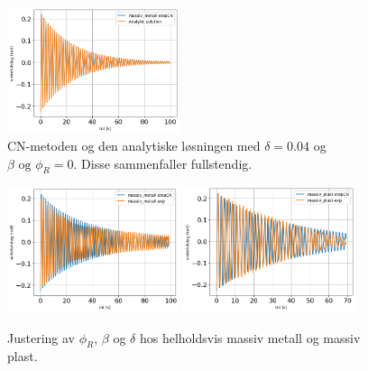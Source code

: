 \documentclass[5p]{elsarticle}
\begin{document}
\begin{figure}[p] 
	\begin{center}
		\includegraphics[width=0.45\textwidth]{Plots/Saved-Plots/combined-analytic/massiv_metall-stepCN.png}
  
 \end{center}
	\caption{CN-metoden og den analytiske løsningen med \(\delta = 0.04\) og \(\beta \text{ og } \phi_R = 0\). Disse sammenfaller fullstendig.}
	\label{Fig CN} %
\end{figure}

\begin{figure}[p] 
	\begin{center}
            \includegraphics[width=0.45\textwidth]{Plots/Saved-Plots/Justert/Massiv metall/massiv_metall-stepCN.png}
		\includegraphics[width=0.45\textwidth]{Plots/Saved-Plots/Justert/Massiv plast/massiv_plast-stepCN copy.png}
 \end{center}
	\caption{Justering av \(\phi_R\), \(\beta\) og \(\delta\) hos helholdsvis massiv metall og massiv plast.}
	\label{Fig tweaking} %
\end{figure}
\end{document}

